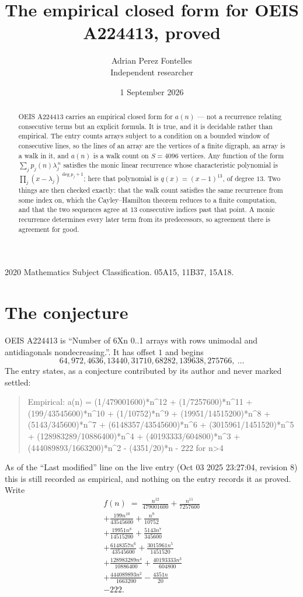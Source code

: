 \documentclass[11pt,a4paper]{article}
\title{The empirical closed form for OEIS A224413, proved}
\author{Adrian Perez Fontelles\\ \small Independent researcher}
\date{1 September 2026}
\theoremstyle{plain}
\theoremstyle{definition}
\begin{document}
\maketitle

\begin{abstract}
OEIS A224413 carries an empirical closed form for $a(n)$ --- not a recurrence relating
consecutive terms but an explicit formula. It is true, and it is decidable rather than
empirical. The entry counts arrays subject to a condition on a bounded window of consecutive lines, so the lines of an array are the
vertices of a finite digraph, an array is a walk in it, and $a(n)$ is a walk count on
$S=4096$ vertices. Any function of the form $\sum_j p_j(n)\lambda_j^{\,n}$ satisfies the
monic linear recurrence whose characteristic polynomial is
$\prod_j(x-\lambda_j)^{\deg p_j+1}$; here that polynomial is $q(x)=(x-1)^{13}$, of degree
$13$. Two things are then checked exactly: that the walk count satisfies the same
recurrence from some index on, which the Cayley--Hamilton theorem reduces to a finite
computation, and that the two sequences agree at $13$ consecutive indices past that
point. A monic recurrence determines every later term from its predecessors, so agreement
there is agreement for good.
\end{abstract}

\noindent\small 2020 Mathematics Subject Classification. 05A15, 11B37, 15A18.\normalsize

\section{The conjecture}

OEIS A224413 is ``Number of 6Xn 0..1 arrays with rows unimodal and antidiagonals nondecreasing.''. It has offset $1$ and begins
\[
64, 972, 4636, 13440, 31710, 68282, 139638, 275766,\ \dots
\]
The entry states, as a conjecture contributed by its author and never marked settled:
\begin{quote}
Empirical: a(n) = (1/479001600)*n\^{}12 + (1/7257600)*n\^{}11 + (199/43545600)*n\^{}10 + (1/10752)*n\^{}9 + (19951/14515200)*n\^{}8 + (5143/345600)*n\^{}7 + (6148357/43545600)*n\^{}6 + (3015961/1451520)*n\^{}5 + (128983289/10886400)*n\^{}4 + (40193333/604800)*n\^{}3 + (444089893/1663200)*n\^{}2 - (4351/20)*n - 222 for n>4
\end{quote}
As of the ``Last modified'' line on the live entry (Oct 03 2025 23:27:04, revision 8) this is still
recorded as empirical, and nothing on the entry records it as proved. Write
\begin{multline*}
f(n)\;=\;\frac{n^{12}}{479001600} + \frac{n^{11}}{7257600} \\
+ \frac{199 n^{10}}{43545600} + \frac{n^{9}}{10752} \\
+ \frac{19951 n^{8}}{14515200} + \frac{5143 n^{7}}{345600} \\
+ \frac{6148357 n^{6}}{43545600} + \frac{3015961 n^{5}}{1451520} \\
+ \frac{128983289 n^{4}}{10886400} + \frac{40193333 n^{3}}{604800} \\
+ \frac{444089893 n^{2}}{1663200} - \frac{4351 n}{20} \\
- 222.
\end{multline*}
\end{document}
